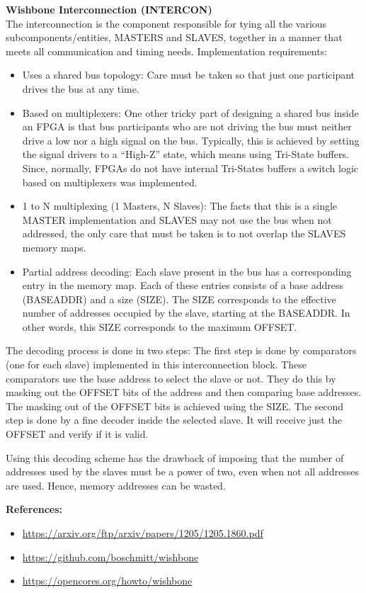 \documentclass[a4paper,12pt,twoside]{article}
\begin{document}
\textbf{Wishbone Interconnection (INTERCON)}\\
The interconnection is the component responsible for tying all the various subcomponents/entities, MASTERS and SLAVES, together in a manner that meets all communication and timing needs. Implementation requirements:
\begin{itemize}
    \item Uses a shared bus topology: Care must be taken so that just one participant drives the bus at any time.
    \item Based on multiplexers: One other tricky part of designing a shared bus inside an FPGA is that bus participants who are not driving the bus must neither drive a low nor a high signal on the bus. Typically, this is achieved by setting the signal drivers to a ``High-Z'' state, which means using Tri-State buffers. Since, normally, FPGAs do not have internal Tri-States buffers a switch logic based on multiplexers was implemented.
    \item 1 to N multiplexing (1 Masters, N Slaves): The facts that this is a single MASTER implementation and SLAVES may not use the bus when not addressed, the only care that must be taken is to not overlap the SLAVES memory maps.
    \item Partial address decoding: Each slave present in the bus has a corresponding entry in the memory map. Each of these entries consists of a base address (BASEADDR) and a size (SIZE). The SIZE corresponds to the effective number of addresses occupied by the slave, starting at the BASEADDR. In other words, this SIZE corresponds to the maximum OFFSET.
\end{itemize}

The decoding process is done in two steps: The first step is done by comparators (one for each slave) implemented in this interconnection block. These comparators use the base address to select the slave or not. They do this by masking out the OFFSET bits of the address and then comparing base addresses. The masking out of the OFFSET bits is achieved using the SIZE. The second step is done by a fine decoder inside the selected slave. It will receive just the OFFSET and verify if it is valid.

Using this decoding scheme has the drawback of imposing that the number of addresses used by the slaves must be a power of two, even when not all addresses are used. Hence, memory addresses can be wasted.

\textbf{References:}
\begin{itemize}
    \item \url{https://arxiv.org/ftp/arxiv/papers/1205/1205.1860.pdf}
    \item \url{https://github.com/boschmitt/wishbone}
    \item \url{https://opencores.org/howto/wishbone}
\end{itemize}
\end{document}
